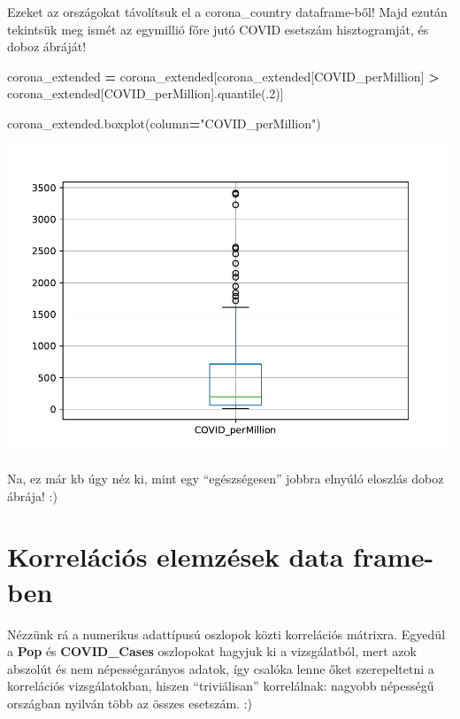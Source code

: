 \documentclass[
]{book}
\newenvironment{Shaded}{\begin{snugshade}}{\end{snugshade}}
\newcommand{\FloatTok}[1]{\textcolor[rgb]{0.00,0.00,0.81}{#1}}
\newcommand{\NormalTok}[1]{#1}
\newcommand{\OperatorTok}[1]{\textcolor[rgb]{0.81,0.36,0.00}{\textbf{#1}}}
\newcommand{\StringTok}[1]{\textcolor[rgb]{0.31,0.60,0.02}{#1}}
\begin{document}
Ezeket az országokat távolítsuk el a corona\_country dataframe-ből!
Majd ezután tekintsük meg ismét az egymillió főre jutó COVID esetszám hisztogramját, és doboz ábráját!

\begin{Shaded}
\begin{Highlighting}[]
\NormalTok{corona\_extended }\OperatorTok{=}\NormalTok{ corona\_extended[corona\_extended[}\StringTok{\textquotesingle{}COVID\_perMillion\textquotesingle{}}\NormalTok{] }\OperatorTok{\textgreater{}}
\NormalTok{                                corona\_extended[}\StringTok{\textquotesingle{}COVID\_perMillion\textquotesingle{}}\NormalTok{].quantile(}\FloatTok{.2}\NormalTok{)]}

\NormalTok{corona\_extended.boxplot(column}\OperatorTok{=}\StringTok{"COVID\_perMillion"}\NormalTok{)}
\end{Highlighting}
\end{Shaded}

\includegraphics{_main_files/figure-latex/unnamed-chunk-121-13.pdf}

Na, ez már kb úgy néz ki, mint egy ``egészségesen'' jobbra elnyúló eloszlás doboz ábrája! :)

\section{Korrelációs elemzések data frame-ben}\label{korreluxe1ciuxf3s-elemzuxe9sek-data-frame-ben}

Nézzünk rá a numerikus adattípusú oszlopok közti korrelációs mátrixra. Egyedül a \textbf{Pop} és \textbf{COVID\_Cases} oszlopokat hagyjuk ki a vizsgálatból, mert azok abszolút és nem népességarányos adatok, így csalóka lenne őket szerepeltetni a korrelációs vizsgálatokban, hiszen ``triviálisan'' korrelálnak: nagyobb népességű országban nyilván több az összes esetszám. :)
\end{document}
